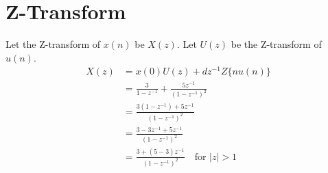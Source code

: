 \documentclass[12pt]{article}
\newcommand{\initialterm}{3}
\newcommand{\commondifference}{5}
\begin{document}
\section{Z-Transform}
Let the Z-transform of \(x(n)\) be \(X(z)\). Let \(U(z)\) be the Z-transform of \(u(n)\).
\begin{align}
X(z) &= x(0)U(z) + dz^{-1}Z\{nu(n)\} \\
&= \frac{\initialterm}{1 - z^{-1}} + \frac{\commondifference z^{-1}}{(1 - z^{-1})^2} \\
&= \frac{\initialterm(1 - z^{-1}) + \commondifference z^{-1}}{(1 - z^{-1})^2} \\
&= \frac{\initialterm - \initialterm z^{-1} + \commondifference z^{-1}}{(1 - z^{-1})^2} \\
&= \frac{\initialterm + (\commondifference - \initialterm)z^{-1}}{(1 - z^{-1})^2} \quad \text{for } |z| > 1
\end{align}
\end{document}
